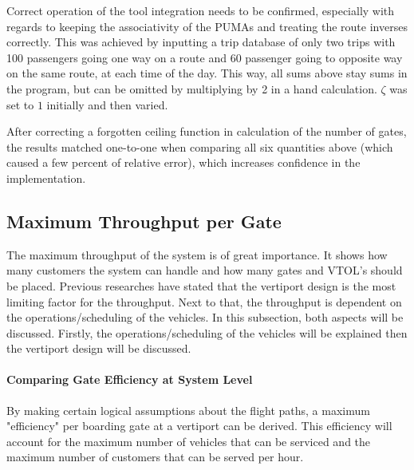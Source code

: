 Correct operation of the tool integration needs to be confirmed, especially with regards to keeping the associativity of the PUMAs and treating the route inverses correctly. This was achieved by inputting a trip database of only two trips with 100 passengers going one way on a route and 60 passenger going to opposite way on the same route, at each time of the day. This way, all sums above stay sums in the program, but can be omitted by multiplying by 2 in a hand calculation. $\zeta$ was set to $1$ initially and then varied.

After correcting a forgotten ceiling function in calculation of the number of gates, the results matched one-to-one when comparing all six quantities above (which caused a few percent of relative error), which increases confidence in the implementation.



\subsection{Maximum Throughput per Gate} \label{subsec:GateThroughput}
The maximum throughput of the system is of great importance. It shows how many customers the system can handle and how many gates and VTOL's should be placed. Previous researches have stated that the vertiport design is the most limiting factor for the throughput. Next to that, the throughput is dependent on the operations/scheduling of the vehicles. In this subsection, both aspects will be discussed. Firstly, the operations/scheduling of the vehicles will be explained then the vertiport design will be discussed.

\paragraph{Comparing Gate Efficiency at System Level}
By making certain logical assumptions about the flight paths, a maximum "efficiency" per boarding gate at a vertiport can be derived. This efficiency will account for the maximum number of vehicles that can be serviced and the maximum number of customers that can be served per hour.

